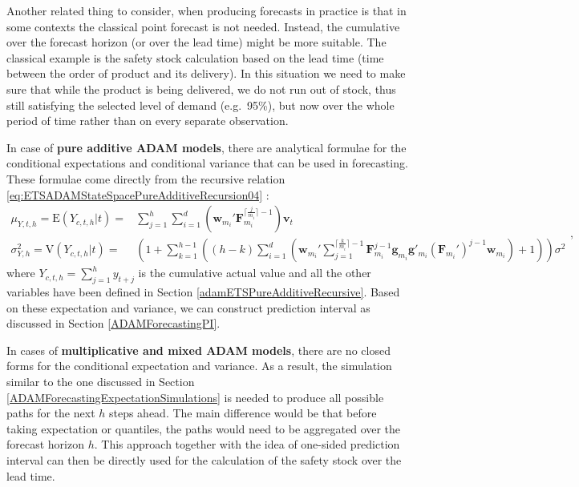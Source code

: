 \documentclass[
]{book}
\theoremstyle{definition}
\theoremstyle{definition}
\theoremstyle{definition}
\theoremstyle{definition}
\theoremstyle{remark}
\begin{document}
Another related thing to consider, when producing forecasts in practice is that in some contexts the classical point forecast is not needed. Instead, the cumulative over the forecast horizon (or over the lead time) might be more suitable. The classical example is the safety stock calculation based on the lead time (time between the order of product and its delivery). In this situation we need to make sure that while the product is being delivered, we do not run out of stock, thus still satisfying the selected level of demand (e.g.~95\%), but now over the whole period of time rather than on every separate observation.

In case of \textbf{pure additive ADAM models}, there are analytical formulae for the conditional expectations and conditional variance that can be used in forecasting. These formulae come directly from the recursive relation \eqref{eq:ETSADAMStateSpacePureAdditiveRecursion04} \citep[for derivations for simpler cases, see for example,][\citet{Svetunkov2017}]{Hyndman2008b}:
\begin{equation}
  \begin{aligned}
    \mu_{Y,t,h} = \text{E}(Y_{c,t,h}|t) = & \sum_{j=1}^h \sum_{i=1}^d \left(\mathbf{w}_{m_i}' \mathbf{F}_{m_i}^{\lceil\frac{j}{m_i}\rceil-1} \right) \mathbf{v}_{t} \\
    \sigma^2_{Y,h} = \text{V}(Y_{c,t,h}|t) = & \left(1 + \sum_{k=1}^{h-1} \left((h-k) \sum_{i=1}^d \left(\mathbf{w}_{m_i}' \sum_{j=1}^{\lceil\frac{k}{m_i}\rceil-1} \mathbf{F}_{m_i}^{j-1} \mathbf{g}_{m_i} \mathbf{g}'_{m_i} (\mathbf{F}_{m_i}')^{j-1} \mathbf{w}_{m_i} \right) + 1 \right) \right) \sigma^2
  \end{aligned},
  \label{eq:ETSADAMStateSpacePureAdditiveRecursionMeanAndVarianceCumulative}
\end{equation}
where \(Y_{c,t,h}=\sum_{j=1}^h y_{t+j}\) is the cumulative actual value and all the other variables have been defined in Section \ref{adamETSPureAdditiveRecursive}. Based on these expectation and variance, we can construct prediction interval as discussed in Section \ref{ADAMForecastingPI}.

In cases of \textbf{multiplicative and mixed ADAM models}, there are no closed forms for the conditional expectation and variance. As a result, the simulation similar to the one discussed in Section \ref{ADAMForecastingExpectationSimulations} is needed to produce all possible paths for the next \(h\) steps ahead. The main difference would be that before taking expectation or quantiles, the paths would need to be aggregated over the forecast horizon \(h\). This approach together with the idea of one-sided prediction interval can then be directly used for the calculation of the safety stock over the lead time.
\end{document}
